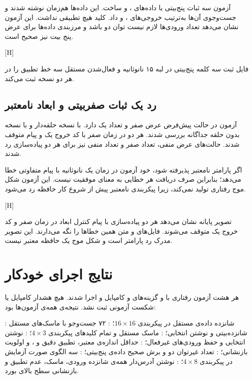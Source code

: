آزمون  سه ثبات پنج‌بیتی با داده‌های ،  و  ساخت. این داده‌ها هم‌زمان نوشته شدند و جست‌وجوی آن‌ها به‌ترتیب خروجی‌های ،  و  داد. کلید  هیچ تطبیقی نداشت. این آزمون نشان می‌دهد تعداد ورودی‌ها لازم نیست توان دو باشد و مرزبندی داده‌ها برای عرض پنج بیت نیز صحیح است.

[H]

فایل  ثبت سه کلمه پنج‌بیتی در لبه ۱۵ نانوثانیه و فعال‌شدن مستقل سه خط تطبیق را در هر دو نسخه ثبت می‌کند.

\subsection{رد یک ثبات صفر‌بیتی و ابعاد نامعتبر}

آزمون  در حالت پیش‌فرض عرض صفر و تعداد یک دارد. با  نسخه حلقه‌دار و با  نسخه بدون حلقه جداگانه بررسی شدند. هر دو در زمان صفر با کد خروج یک و پیام  متوقف شدند. حالت‌های عرض منفی، تعداد صفر و تعداد منفی نیز برای هر دو پیاده‌سازی رد شدند.

اگر پارامتر نامعتبر پذیرفته شود، خود آزمون در زمان یک نانوثانیه با پیام متفاوتی خطا می‌دهد؛ بنابراین صرف دریافت هر خطایی به معنای موفقیت نیست. این آزمون شکل موج رفتاری تولید نمی‌کند، زیرا پیکربندی نامعتبر پیش از شروع کار حافظه رد می‌شود.

[H]

تصویر پایانه نشان می‌دهد هر دو پیاده‌سازی با پیام کنترل ابعاد در زمان صفر و کد خروج یک متوقف می‌شوند. فایل‌های  و  متن همین خطاها را نگه می‌دارند. این تصویر مدرک رد پارامتر است و شکل موج یک حافظه معتبر نیست.

\section{نتایج اجرای خودکار}

هر هشت آزمون رفتاری با  و گزینه‌های  و 
کامپایل و اجرا شدند. هیچ هشدار کامپایل یا شکست آزمونی ثبت نشد. نتیجه‌ی همه‌ی آزمون‌ها
 بود:

 : شانزده داده‌ی مستقل در پیکربندی $16\times16$؛
 : ۷۲ جست‌وجو با ماسک‌های مستقل شانزده‌بیتی و نوشتن انتخابی؛
 : ماسک مستقل و تمام کلیدهای پیکربندی $4\times3$؛
 : نوشتن انتخابی و حفظ ورودی‌های غیرفعال؛
 : حداقل اندازه‌ی معتبر، تطبیق دقیق و ، و اولویت بازنشانی؛
 : تعداد غیرتوان دو و برش صحیح داده‌ی پنج‌بیتی؛
 : سه الگوی صورت آزمایش در پیکربندی $4\times8$؛
 : نوشتن آدرس‌دار همه‌ی شانزده ورودی، ماسک، عدم تطبیق و بازنشانی سطح بالای بورد.

